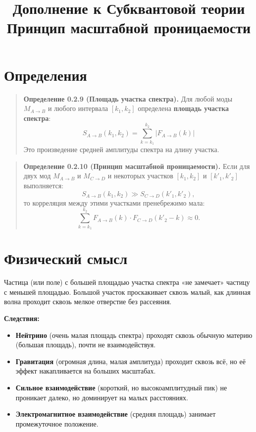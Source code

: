 \documentclass[12pt,a4paper]{article}
\title{\textbf{Дополнение к Субквантовой теории}\\
\large Принцип масштабной проницаемости}
\author{}
\date{}
\begin{document}
\maketitle

\section{Определения}

\begin{quote}
\textbf{Определение 0.2.9 (Площадь участка спектра).} Для любой моды $M_{A \to B}$ и любого интервала $[k_1, k_2]$ определена \textbf{площадь участка спектра}:
\begin{equation}
    S_{A \to B}(k_1, k_2) = \sum_{k=k_1}^{k_2} |F_{A \to B}(k)|
\end{equation}
Это произведение средней амплитуды спектра на длину участка.
\end{quote}

\begin{quote}
\textbf{Определение 0.2.10 (Принцип масштабной проницаемости).} Если для двух мод $M_{A \to B}$ и $M_{C \to D}$ и некоторых участков $[k_1, k_2]$ и $[k'_1, k'_2]$ выполняется:
\begin{equation}
    S_{A \to B}(k_1, k_2) \gg S_{C \to D}(k'_1, k'_2),
\end{equation}
то корреляция между этими участками пренебрежимо мала:
\begin{equation}
    \sum_{k=k_1}^{k_2} F_{A \to B}(k) \cdot F_{C \to D}(k'_2 - k) \approx 0.
\end{equation}
\end{quote}

\section{Физический смысл}

Частица (или поле) с большей площадью участка спектра «не замечает» частицу с меньшей площадью. Большой участок проскакивает сквозь малый, как длинная волна проходит сквозь мелкое отверстие без рассеяния.

\textbf{Следствия:}
\begin{itemize}
    \item \textbf{Нейтрино} (очень малая площадь спектра) проходят сквозь обычную материю (большая площадь), почти не взаимодействуя.
    \item \textbf{Гравитация} (огромная длина, малая амплитуда) проходит сквозь всё, но её эффект накапливается на больших масштабах.
    \item \textbf{Сильное взаимодействие} (короткий, но высокоамплитудный пик) не проникает далеко, но доминирует на малых расстояниях.
    \item \textbf{Электромагнитное взаимодействие} (средняя площадь) занимает промежуточное положение.
\end{itemize}
\end{document}
